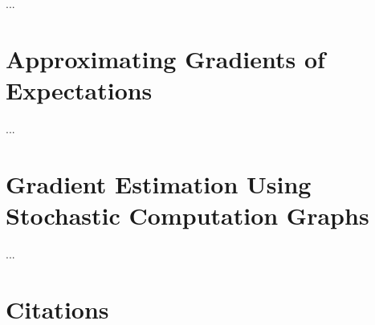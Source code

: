 \documentclass[11pt]{article}
\theoremstyle{definition}
\theoremstyle{plain}
\begin{document}
...

\section{Approximating Gradients of Expectations}

...

\section{Gradient Estimation Using Stochastic Computation Graphs}

...

\section{Citations}
\end{document}
